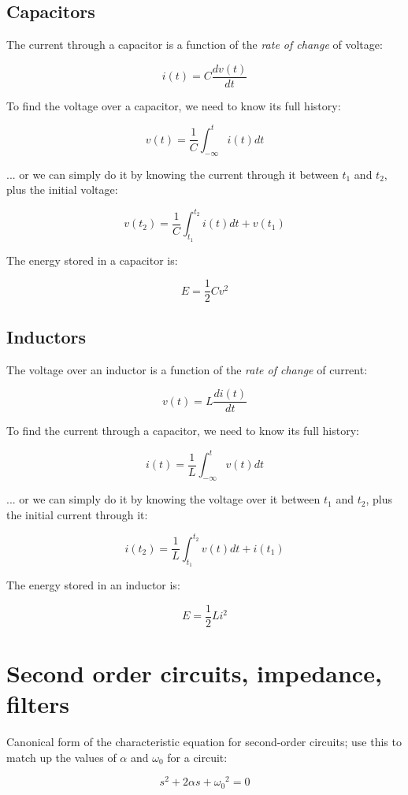 \documentclass[12pt,a4paper]{report}
\begin{document}
\subsection{Capacitors}

The current through a capacitor is a function of the \emph{rate of change} of voltage:

\[ i(t) = C \frac{dv(t)}{dt} \]

To find the voltage over a capacitor, we need to know its full history:

\[ v(t) = \frac{1}{C} \int_{-\infty}^{t} i(t) dt \]

... or we can simply do it by knowing the current through it between $t_1$ and $t_2$, plus the initial voltage:

\[ v(t_2) = \frac{1}{C} \int_{t_1}^{t_2} i(t) dt + v(t_1) \]

The energy stored in a capacitor is:

\[ E = \frac{1}{2} C v^2 \]

\subsection{Inductors}

The voltage over an inductor is a function of the \emph{rate of change} of current:

\[ v(t) = L \frac{di(t)}{dt} \]

To find the current through a capacitor, we need to know its full history:

\[ i(t) = \frac{1}{L} \int_{-\infty}^t v(t) dt \]

... or we can simply do it by knowing the voltage over it between $t_1$ and $t_2$, plus the initial current through it:

\[ i(t_2) = \frac{1}{L} \int_{t_1}^{t_2} v(t) dt + i(t_1) \]

The energy stored in an inductor is:

\[ E = \frac{1}{2} L i^2 \]

\newpage

\section{Second order circuits, impedance, filters}

Canonical form of the characteristic equation for second-order circuits; use this to match up the values of $\alpha$ and $\omega_0$ for a circuit:

\[ s^2 + 2\alpha s + {\omega_0}^2 = 0 \]
\end{document}
